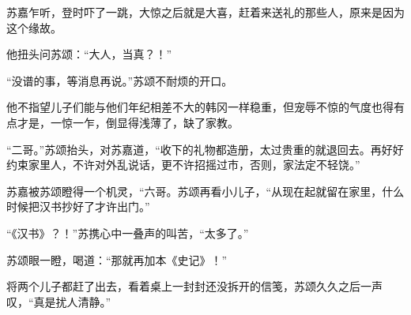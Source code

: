 苏嘉乍听，登时吓了一跳，大惊之后就是大喜，赶着来送礼的那些人，原来是因为这个缘故。

他扭头问苏颂：“大人，当真？！”

“没谱的事，等消息再说。”苏颂不耐烦的开口。

他不指望儿子们能与他们年纪相差不大的韩冈一样稳重，但宠辱不惊的气度也得有点才是，一惊一乍，倒显得浅薄了，缺了家教。

“二哥。”苏颂抬头，对苏嘉道，“收下的礼物都造册，太过贵重的就退回去。再好好约束家里人，不许对外乱说话，更不许招摇过市，否则，家法定不轻饶。”

苏嘉被苏颂瞪得一个机灵，“六哥。苏颂再看小儿子，“从现在起就留在家里，什么时候把汉书抄好了才许出门。”

“《汉书》？！”苏携心中一叠声的叫苦，“太多了。”

苏颂眼一瞪，喝道：“那就再加本《史记》！”

将两个儿子都赶了出去，看着桌上一封封还没拆开的信笺，苏颂久久之后一声叹，“真是扰人清静。”

